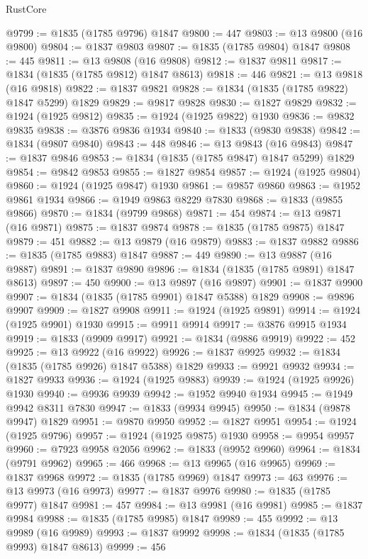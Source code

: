 \begin{lexlean}{RustCore}
\begin{coremodule}
@9799 := @1835 (@1785 @9796) @1847
@9800 := 447
@9803 := @13 @9800 (@16 @9800)
@9804 := @1837 @9803
@9807 := @1835 (@1785 @9804) @1847
@9808 := 445
@9811 := @13 @9808 (@16 @9808)
@9812 := @1837 @9811
@9817 := @1834 (@1835 (@1785 @9812) @1847 @8613)
@9818 := 446
@9821 := @13 @9818 (@16 @9818)
@9822 := @1837 @9821
@9828 := @1834 (@1835 (@1785 @9822) @1847 @5299) @1829
@9829 := @9817 @9828
@9830 := @1827 @9829
@9832 := @1924 (@1925 @9812)
@9835 := @1924 (@1925 @9822) @1930
@9836 := @9832 @9835
@9838 := @3876 @9836 @1934
@9840 := @1833 (@9830 @9838)
@9842 := @1834 (@9807 @9840)
@9843 := 448
@9846 := @13 @9843 (@16 @9843)
@9847 := @1837 @9846
@9853 := @1834 (@1835 (@1785 @9847) @1847 @5299) @1829
@9854 := @9842 @9853
@9855 := @1827 @9854
@9857 := @1924 (@1925 @9804)
@9860 := @1924 (@1925 @9847) @1930
@9861 := @9857 @9860
@9863 := @1952 @9861 @1934
@9866 := @1949 @9863 @8229 @7830
@9868 := @1833 (@9855 @9866)
@9870 := @1834 (@9799 @9868)
@9871 := 454
@9874 := @13 @9871 (@16 @9871)
@9875 := @1837 @9874
@9878 := @1835 (@1785 @9875) @1847
@9879 := 451
@9882 := @13 @9879 (@16 @9879)
@9883 := @1837 @9882
@9886 := @1835 (@1785 @9883) @1847
@9887 := 449
@9890 := @13 @9887 (@16 @9887)
@9891 := @1837 @9890
@9896 := @1834 (@1835 (@1785 @9891) @1847 @8613)
@9897 := 450
@9900 := @13 @9897 (@16 @9897)
@9901 := @1837 @9900
@9907 := @1834 (@1835 (@1785 @9901) @1847 @5388) @1829
@9908 := @9896 @9907
@9909 := @1827 @9908
@9911 := @1924 (@1925 @9891)
@9914 := @1924 (@1925 @9901) @1930
@9915 := @9911 @9914
@9917 := @3876 @9915 @1934
@9919 := @1833 (@9909 @9917)
@9921 := @1834 (@9886 @9919)
@9922 := 452
@9925 := @13 @9922 (@16 @9922)
@9926 := @1837 @9925
@9932 := @1834 (@1835 (@1785 @9926) @1847 @5388) @1829
@9933 := @9921 @9932
@9934 := @1827 @9933
@9936 := @1924 (@1925 @9883)
@9939 := @1924 (@1925 @9926) @1930
@9940 := @9936 @9939
@9942 := @1952 @9940 @1934
@9945 := @1949 @9942 @8311 @7830
@9947 := @1833 (@9934 @9945)
@9950 := @1834 (@9878 @9947) @1829
@9951 := @9870 @9950
@9952 := @1827 @9951
@9954 := @1924 (@1925 @9796)
@9957 := @1924 (@1925 @9875) @1930
@9958 := @9954 @9957
@9960 := @7923 @9958 @2056
@9962 := @1833 (@9952 @9960)
@9964 := @1834 (@9791 @9962)
@9965 := 466
@9968 := @13 @9965 (@16 @9965)
@9969 := @1837 @9968
@9972 := @1835 (@1785 @9969) @1847
@9973 := 463
@9976 := @13 @9973 (@16 @9973)
@9977 := @1837 @9976
@9980 := @1835 (@1785 @9977) @1847
@9981 := 457
@9984 := @13 @9981 (@16 @9981)
@9985 := @1837 @9984
@9988 := @1835 (@1785 @9985) @1847
@9989 := 455
@9992 := @13 @9989 (@16 @9989)
@9993 := @1837 @9992
@9998 := @1834 (@1835 (@1785 @9993) @1847 @8613)
@9999 := 456

\end{coremodule}
\end{lexlean}
